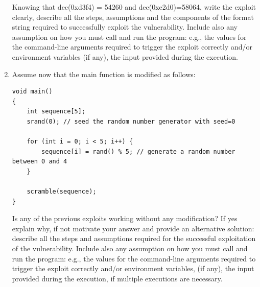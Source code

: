 \begin{enumerate}
\begin{itemize}
        \end{itemize}
        Knowing that dec(0xd3f4) = 54260 and dec(0xe2d0)=58064, write the exploit clearly, describe all the steps, assumptions and the components of the format string required to successfully exploit the vulnerability. 
        Include also any assumption on how you must call and run the program: e.g., the values for the command-line arguments required to trigger the exploit correctly and/or environment variables (if any), the input provided during the execution.
    \item Assume now that the main function is modified as follows:
\begin{verbatim}
void main() 
{
    int sequence[5];
    srand(0); // seed the random number generator with seed=0

    for (int i = 0; i < 5; i++) {
        sequence[i] = rand() % 5; // generate a random number between 0 and 4
    }

    scramble(sequence);
}
\end{verbatim}
        Is any of the previous exploits working without any modification? 
        If yes explain why, if not motivate your answer and provide an alternative solution: describe all the steps and assumptions required for the successful exploitation of the vulnerability. 
        Include also any assumption on how you must call and run the program: e.g., the values for the command-line arguments required to trigger the exploit correctly and/or environment variables, (if any), the input provided during the execution, if multiple executions are necessary.
\end{enumerate}

